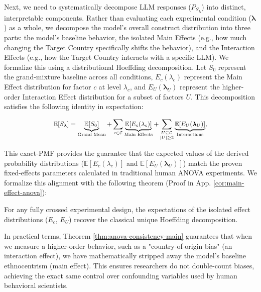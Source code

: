 Next, we need to systematically decompose LLM responses ($P_{S_{\boldsymbol{\lambda}}}$) into distinct, interpretable components. 
Rather than evaluating each experimental condition ($\boldsymbol{\lambda}$) as a whole, 
we decompose the model's overall construct distribution into three parts: 
the model's baseline behavior, 
the isolated Main Effects (e.g., how much changing the Target Country specifically shifts the behavior), 
and the Interaction Effects (e.g., how the Target Country interacts with a specific LLM). 
We formalize this using a distributional Hoeffding decomposition. 
Let $S_0$ represent the grand-mixture baseline across all conditions, $E_c(\lambda_c)$ represent the Main Effect distribution for factor $c$ at level $\lambda_c$, and $E_U(\boldsymbol{\lambda}_U)$ represent the higher-order Interaction Effect distribution for a subset of factors $U$. 
This decomposition satisfies the following identity in expectation:

\begin{equation}
\label{eq:anova-identity-main}
\small
\mathbb{E}[S_{\boldsymbol{\lambda}}] = \underbrace{\mathbb{E}[S_0]}_{\text{Grand Mean}} + \sum_{c \in \mathcal{C}} \underbrace{\mathbb{E}[E_c(\lambda_c)]}_{\text{Main Effects}} + \sum_{\substack{U \subseteq \mathcal{C} \\ |U| \ge 2}} \underbrace{\mathbb{E}[E_U(\boldsymbol{\lambda}_U)]}_{\text{Interactions}},
\end{equation}

This exact-PMF provides the guarantee that the expected values of the derived probability distributions ($\mathbb{E}[E_c(\lambda_c)]$ and $\mathbb{E}[E_U(\boldsymbol{\lambda}_U)]$) match the proven fixed-effects parameters calculated in traditional human ANOVA experiments. 
We formalize this alignment with the following theorem (Proof in App. \ref{cor:main-effect-anova}):
\begin{theorem}
\label{thm:anova-consistency-main}
For any fully crossed experimental design, the expectations of the isolated effect distributions ($E_c$, $E_U$) recover the classical unique Hoeffding decomposition.
\end{theorem}
In practical terms, Theorem \ref{thm:anova-consistency-main} guarantees that when we measure a higher-order behavior, such as a "country-of-origin bias" (an interaction effect), we have mathematically stripped away the model's baseline ethnocentrism (main effect). 
This ensures researchers do not double-count biases, achieving the exact same control over confounding variables used by human behavioral scientists.

